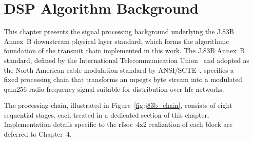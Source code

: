 

\chapter{DSP Algorithm Background}
\label{ch:dsp_background}

This chapter presents the signal processing background underlying
the J.83B Annex~B downstream physical layer standard, which forms
the algorithmic foundation of the transmit chain
implemented in this work.
The J.83B Annex~B standard, defined by the International
Telecommunication Union~\cite{ITU_J83} and adopted as the North
American cable modulation standard by ANSI/SCTE~\cite{SCTE07},
specifies a fixed processing chain that transforms an
\ac{mpegts} byte stream into a modulated \ac{qam256} radio-frequency signal
suitable for distribution over \ac{hfc} networks.

The processing chain, illustrated in Figure~\ref{fig:j83b_chain},
consists of eight sequential stages, each treated in a dedicated
section of this chapter.
Implementation details specific to the \ac{rfsoc}~4x2 realization of
each block are deferred to Chapter~4.

